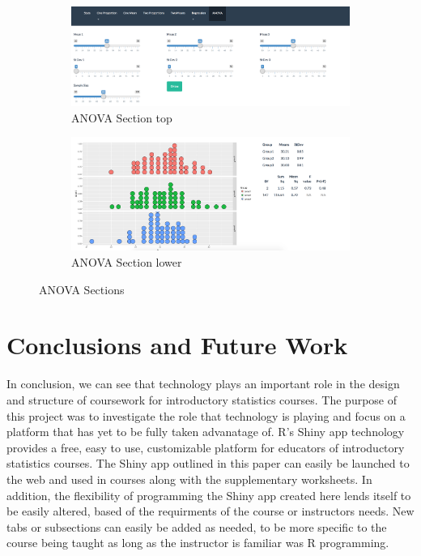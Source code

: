\documentclass[11pt]{book}
\begin{document}
\begin{figure}
        \centering

        \begin{subfigure}[b]{0.75\textwidth}
                \includegraphics[width=\textwidth]{ANOVAUP.png}
                \caption{ANOVA Section top }
                \label{fig:ANOVALOW}
        \end{subfigure}%

        \begin{subfigure}[b]{0.75\textwidth}
                \includegraphics[width=\textwidth]{ANOVALOW.png}
                \caption{ANOVA Section lower} 
                \label{fig:ANOVALOW}
        \end{subfigure}

\caption {ANOVA Sections}
\end{figure}


\section{Conclusions and Future Work}
In conclusion, we can see that technology plays an important role in the design and structure of coursework for introductory statistics courses. The purpose of this project was to investigate the role that technology is playing and focus on a platform that has yet to be fully taken advanatage of.  R's Shiny app technology provides a free, easy to use, customizable platform for educators of introductory statistics courses. The Shiny app outlined in this paper can easily be launched to the web and used in courses along with the supplementary worksheets. In addition, the flexibility of programming the Shiny app created here lends itself to be easily altered, based of the requirments of the course or instructors needs. New tabs or subsections can easily be added as needed, to be more specific to the course being taught as long as the instructor is familiar was R programming. 
\end{document}
